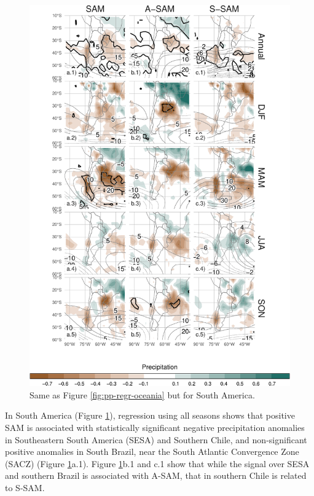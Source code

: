 \documentclass[smallextended]{svjour3}       %
\begin{document}
\begin{figure}
\includegraphics{pp-regr-america-1} \caption{Same as Figure \ref{fig:pp-regr-oceania} but for South America.}\label{fig:pp-regr-america}
\end{figure}

In South America (Figure \ref{fig:pp-regr-america}), regression using all seasons shows that positive SAM is associated with statistically significant negative precipitation anomalies in Southeastern South America (SESA) and Southern Chile, and non-significant positive anomalies in South Brazil, near the South Atlantic Convergence Zone (SACZ) (Figure \ref{fig:pp-regr-america}a.1).
Figure \ref{fig:pp-regr-america}b.1 and c.1 show that while the signal over SESA and southern Brazil is associated with A\nobreakdash-SAM, that in southern Chile is related to S\nobreakdash-SAM.
\end{document}
